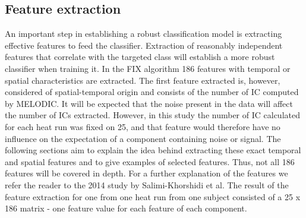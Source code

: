 \subsection{Feature extraction}
An important step in establishing a robust classification model is extracting effective features to feed the classifier. Extraction of reasonably independent features that correlate with the targeted class will establish a more robust classifier when training it. In the FIX algorithm 186 features with temporal or spatial characteristics are extracted. The first feature extracted is, however, considered of spatial-temporal origin and consists of the number of IC computed by MELODIC. It will be expected that the noise present in the data will affect the number of ICs extracted. \cite{Salimi-Khorshidi2014} However, in this study the number of IC calculated for each heat run was fixed on 25, and that feature would therefore have no influence on the expectation of a component containing noise or signal. 
The following sections aim to explain the idea behind extracting these exact temporal and spatial features and to give examples of selected features. Thus, not all 186 features will be covered in depth. For a further explanation of the features we refer the reader to the 2014 study by Salimi-Khorshidi et al. \cite{Salimi-Khorshidi2014} The result of the feature extraction for one from one heat run from one subject consisted of a 25 x 186 matrix - one feature value for each feature of each component.

